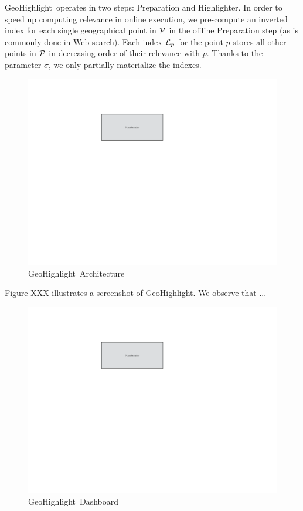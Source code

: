 \documentclass[conference]{IEEEtran}
\newcommand{\sys}{{\sc GeoHighlight}}
\newcommand{\framework}{{\sc GeoHighlight}}
\begin{document}
\framework\ operates in two steps: {\sc Preparation} and {\sc Highlighter}. In order to speed up computing relevance in online execution, we pre-compute an inverted index for each single geographical point in ${\cal P}$ in the offline {\sc Preparation} step (as is commonly done in Web search). Each index ${\cal L}_p$ for the point $p$ stores all other points in ${\cal P}$ in decreasing order of their relevance with $p$. Thanks to the parameter $\sigma$, we only partially materialize the indexes.


 \begin{figure}[t]
   \centering
   \includegraphics[width=\columnwidth]{figs/placeholder}
 \caption{\framework\ Architecture}
 \label{fig:architecture}
 \vspace{-10pt}
 \end{figure}

Figure XXX illustrates a screenshot of \sys. We observe that ...

 \begin{figure}[t]
   \centering
   \includegraphics[width=\columnwidth]{figs/placeholder}
 \caption{\framework\ Dashboard}
 \label{fig:dashboard}
 \vspace{-10pt}
 \end{figure}
\end{document}
